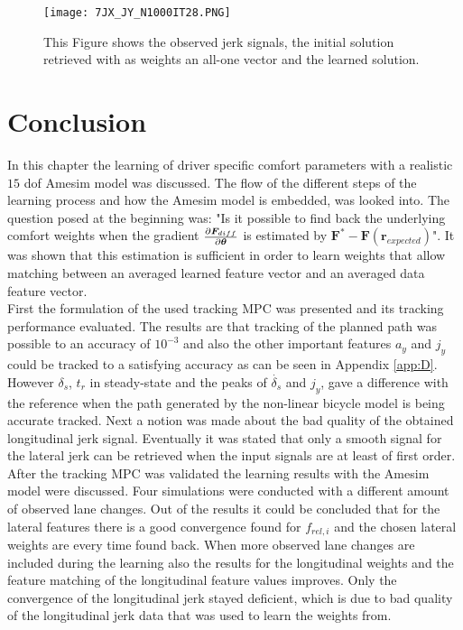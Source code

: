 \begin{figure}[h!]
	\centering
	\texttt{[image: 7JX\_JY\_N1000IT28.PNG]}
	\caption{This Figure shows the observed jerk signals, the initial solution retrieved with as weights an all-one vector and the learned solution.}	
	\label{fig:complex_jerk}
\end{figure}
 \newpage                                
\section{Conclusion}
In this chapter the learning of driver specific comfort parameters with a realistic $15$ dof Amesim model was discussed. The flow of the different steps of the learning process and how the Amesim model is embedded, was looked into. The question posed at the beginning was: "Is it possible to find back the underlying comfort weights when the gradient $\pdv{\bm{F}_{diff}}{\bm{\theta}}$ is estimated by $ \bm{F}^* - \bm{F}(\bm{r}_{expected})$". It was shown that this estimation is sufficient in order to learn weights that allow matching between an averaged learned feature vector and an averaged data feature vector.\\

First the formulation of the used tracking MPC was presented and its tracking performance evaluated. The results are that tracking of the planned path was possible to an accuracy of $10^{-3}$ and also the other important features $a_y$ and $j_y$ could be tracked to a satisfying accuracy as can be seen in Appendix \ref{app:D}. However $\delta_s$, $t_r$ in steady-state and the peaks of $\dot{\delta_s}$ and $j_y$, gave a difference with the reference when the path generated by the non-linear bicycle model is being accurate tracked. Next a notion was made about the bad quality of the obtained longitudinal jerk signal. Eventually it was stated that only a smooth signal for the lateral jerk can be retrieved when the input signals are at least of first order. \\

After the tracking MPC was validated the learning results with the Amesim model were discussed. Four simulations were conducted with a different amount of observed lane changes. Out of the results it could be concluded that for the lateral features there is a good convergence found for $f_{rel,i}$ and the chosen lateral weights are every time found back. When more observed lane changes are included during the learning also the results for the longitudinal weights and the feature matching of the longitudinal feature values improves. Only the convergence of the longitudinal jerk stayed deficient, which is due to bad quality of the longitudinal jerk data that was used to learn the weights from.



